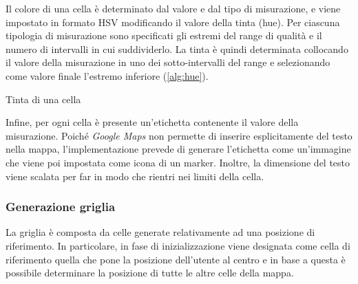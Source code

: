 \documentclass[11pt]{article}
\def\gmaps{\textit{Google Maps}}
\begin{document}
Il colore di una cella è determinato dal valore e dal tipo di misurazione, e viene impostato in formato HSV modificando il valore della tinta (hue).
Per ciascuna tipologia di misurazione sono specificati gli estremi del range di qualità e il numero di intervalli in cui suddividerlo.
La tinta è quindi determinata collocando il valore della misurazione in uno dei sotto-intervalli del range e selezionando come valore finale l'estremo inferiore (\cref{alg:hue}).

\begin{algorithm}[H]
  \caption{Tinta di una cella}\label{alg:hue}
  \SetAlgoLined
\end{algorithm}

Infine, per ogni cella è presente un'etichetta contenente il valore della misurazione. Poiché \gmaps{} non permette di inserire esplicitamente del testo nella mappa, l'implementazione prevede di generare l'etichetta come un'immagine che viene poi impostata come icona di un marker. Inoltre, la dimensione del testo viene scalata per far in modo che rientri nei limiti della cella.


\subsubsection{Generazione griglia}
La griglia è composta da celle generate relativamente ad una posizione di riferimento. In particolare, in fase di inizializzazione viene designata come cella di riferimento quella che pone la posizione dell'utente al centro e in base a questa è possibile determinare la posizione di tutte le altre celle della mappa. 
\end{document}
